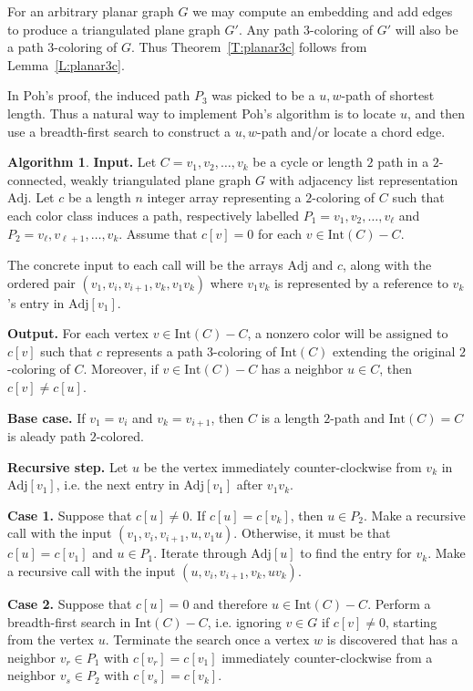 \documentclass[12pt,letterpaper]{article}
\theoremstyle{plain}
\theoremstyle{definition}
\theoremstyle{break}
\newtheorem{algorithm}[lemma]{Algorithm}     %
\begin{document}
For an arbitrary planar graph $G$ we may compute an embedding and add edges
to produce a triangulated plane graph $G'$. Any path $3$-coloring of
$G'$ will also be a path $3$-coloring of $G$. Thus Theorem~\ref{T:planar3c}
follows from Lemma~\ref{L:planar3c}.

In Poh's proof, the induced path $P_3$ was picked to be a $u,w$-path of
shortest length.
Thus a natural way to implement Poh's algorithm is to locate $u$,
and then use a breadth-first search
to construct a $u,w$-path and/or locate
a chord edge.

\begin{algorithm}\label{A:poh_bfs}
\textbf{Input.} 
Let $C=v_1,v_2,\ldots,v_k$ be a cycle or length $2$ path
in a $2$-connected,
weakly triangulated plane
graph $G$ with adjacency list representation $\text{Adj}$.
Let 
$c$ be a length $n$ integer array representing a $2$-coloring of $C$ such
that each color class induces a path, respectively labelled
$P_1=v_1,v_2,\ldots,v_\ell$ and $P_2=v_\ell,v_{\ell+1},\ldots,v_k$. Assume that
$c[v]=0$ for each $v\in\text{Int}(C)-C$.

The concrete input to each call will be the arrays $\text{Adj}$ and $c$,
along with the ordered pair
$(v_1, v_i, v_{i+1}, v_k, v_1v_k)$ where $v_1v_k$ is represented by
a reference to $v_k$'s entry in $\text{Adj}[v_1]$. 

\textbf{Output.} For each vertex $v\in\text{Int}(C)-C$, a nonzero color will be
assigned to $c[v]$ such that $c$ represents a path $3$-coloring of
$\text{Int}(C)$ extending the original $2$-coloring of $C$. Moreover, if
$v\in \text{Int}(C)-C$ has a neighbor $u\in C$, then $c[v]\ne c[u]$.

\textbf{Base case.} If $v_1=v_i$ and $v_k=v_{i+1}$, then $C$ is a length
$2$-path and $\text{Int}(C)=C$ is aleady path $2$-colored.

\textbf{Recursive step.} Let $u$ be the vertex immediately counter-clockwise
from $v_k$ in $\text{Adj}[v_1]$, i.e. the next entry in $\text{Adj}[v_1]$
after $v_1v_k$.

\textbf{Case 1.} Suppose that $c[u]\ne 0$.
If $c[u]=c[v_k]$, then $u\in P_2$. Make a recursive call with the input
$(v_1, v_i, v_{i+1}, u, v_1u)$. Otherwise, it must be that $c[u]=c[v_1]$
and $u\in P_1$. Iterate through $\text{Adj}[u]$ to find the entry for
$v_k$. Make a recursive call with the input $(u, v_i, v_{i+1}, v_k, uv_k)$. 

\textbf{Case 2.} Suppose that $c[u]=0$ and therefore $u\in \text{Int}(C)-C$.
Perform a breadth-first search in $\text{Int}(C)-C$, i.e. ignoring $v\in G$
if $c[v]\ne 0$, starting from the vertex $u$. Terminate the search once a vertex
$w$ is discovered that has a neighbor $v_r\in P_1$ with $c[v_r]=c[v_1]$
immediately counter-clockwise from a neighbor $v_s\in P_2$ with
$c[v_s]=c[v_k]$.


\end{algorithm}
\end{document}
